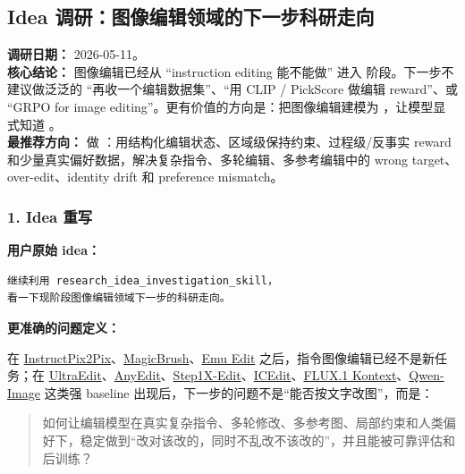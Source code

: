 \subsection*{Idea 调研：图像编辑领域的下一步科研走向}
{}

\begin{conceptbox}
\textbf{调研日期：} 2026-05-11。\\
\textbf{核心结论：} 图像编辑已经从 ``instruction editing 能不能做'' 进入  阶段。下一步不建议做泛泛的 ``再收一个编辑数据集''、``用 CLIP / PickScore 做编辑 reward''、或 ``GRPO for image editing''。更有价值的方向是：把图像编辑建模为 ，让模型显式知道 。\\
\textbf{最推荐方向：} 做 ：用结构化编辑状态、区域级保持约束、过程级/反事实 reward 和少量真实偏好数据，解决复杂指令、多轮编辑、多参考编辑中的 wrong target、over-edit、identity drift 和 preference mismatch。
\end{conceptbox}

\subsubsection*{1. Idea 重写}

\textbf{用户原始 idea：}

\begin{lstlisting}[language={},basicstyle=\ttfamily\small]
继续利用 research_idea_investigation_skill，
看一下现阶段图像编辑领域下一步的科研走向。
\end{lstlisting}

\textbf{更准确的问题定义：}

在 \href{https://arxiv.org/abs/2211.09800}{InstructPix2Pix}、\href{https://arxiv.org/abs/2306.10012}{MagicBrush}、\href{https://arxiv.org/abs/2311.10089}{Emu Edit} 之后，指令图像编辑已经不是新任务；在 \href{https://arxiv.org/abs/2407.05282}{UltraEdit}、\href{https://arxiv.org/abs/2411.15738}{AnyEdit}、\href{https://arxiv.org/abs/2504.17761}{Step1X-Edit}、\href{https://arxiv.org/abs/2504.20690}{ICEdit}、\href{https://arxiv.org/abs/2506.15742}{FLUX.1 Kontext}、\href{https://arxiv.org/abs/2508.02324}{Qwen-Image} 这类强 baseline 出现后，下一步的问题不是“能否按文字改图”，而是：

\begin{quote}
如何让编辑模型在真实复杂指令、多轮修改、多参考图、局部约束和人类偏好下，稳定做到“改对该改的，同时不乱改不该改的”，并且能被可靠评估和后训练？
\end{quote}

